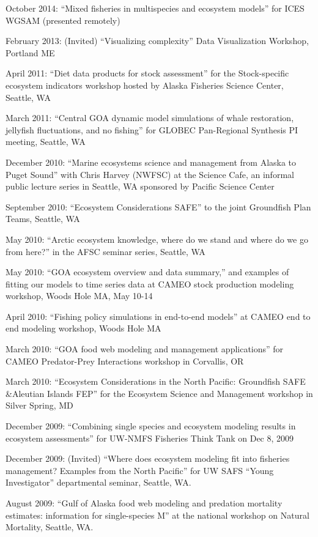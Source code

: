 \documentclass[11pt, a4paper]{awesome-cv}
\begin{document}
October 2014: ``Mixed fisheries in multispecies and ecosystem models''
for ICES WGSAM (presented remotely)

February 2013: (Invited) ``Visualizing complexity'' Data Visualization
Workshop, Portland ME

April 2011: ``Diet data products for stock assessment'' for the
Stock-specific ecosystem indicators workshop hosted by Alaska Fisheries
Science Center, Seattle, WA

March 2011: ``Central GOA dynamic model simulations of whale
restoration, jellyfish fluctuations, and no fishing'' for GLOBEC
Pan-Regional Synthesis PI meeting, Seattle, WA

December 2010: ``Marine ecosystems science and management from Alaska to
Puget Sound'' with Chris Harvey (NWFSC) at the Science Cafe, an informal
public lecture series in Seattle, WA sponsored by Pacific Science Center

September 2010: ``Ecosystem Considerations SAFE'' to the joint
Groundfish Plan Teams, Seattle, WA

May 2010: ``Arctic ecosystem knowledge, where do we stand and where do
we go from here?'' in the AFSC seminar series, Seattle, WA

May 2010: ``GOA ecosystem overview and data summary,'' and examples of
fitting our models to time series data at CAMEO stock production
modeling workshop, Woods Hole MA, May 10-14

April 2010: ``Fishing policy simulations in end-to-end models'' at CAMEO
end to end modeling workshop, Woods Hole MA

March 2010: ``GOA food web modeling and management applications'' for
CAMEO Predator-Prey Interactions workshop in Corvallis, OR

March 2010: ``Ecosystem Considerations in the North Pacific: Groundfish
SAFE \&Aleutian Islands FEP'' for the Ecosystem Science and Management
workshop in Silver Spring, MD

December 2009: ``Combining single species and ecosystem modeling results
in ecosystem assessments'' for UW-NMFS Fisheries Think Tank on Dec 8,
2009

December 2009: (Invited) ``Where does ecosystem modeling fit into
fisheries management? Examples from the North Pacific'' for UW SAFS
``Young Investigator'' departmental seminar, Seattle, WA.

August 2009: ``Gulf of Alaska food web modeling and predation mortality
estimates: information for single-species M'' at the national workshop
on Natural Mortality, Seattle, WA.
\end{document}
